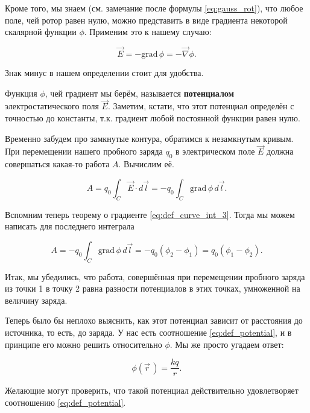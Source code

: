 \documentclass[11pt,a4paper]{article}
\numberwithin{equation}{section}
\newcommand{\grad}{\mathrm{grad}\,}
\newcommand{\vn}{\vec{\nabla}}
\begin{document}
Кроме того, мы знаем (см. замечание после формулы
\eqref{eq:gauss_rot}), что любое поле, чей ротор равен нулю, можно
представить в виде градиента некоторой скалярной функции
$\phi$. Применим это к нашему случаю:

\begin{equation}
  \label{eq:def_potential}
  \vec{E}  = -\grad \phi = -\vn \phi.
\end{equation}

Знак минус в нашем определении стоит для удобства.

Функция $\phi$, чей градиент мы берём, называется \textbf{потенциалом}
электростатического поля $\vec{E}$. Заметим, кстати, что этот
потенциал определён с точностью до константы, т.к. градиент любой
постоянной функции равен нулю. 

Временно забудем про замкнутые контура, обратимся к незамкнутым
кривым. При перемещении нашего пробного заряда $q_0$ в электрическом поле
$\vec{E}$ должна совершаться какая-то работа $A$. Вычислим её. 

\begin{equation}
  \label{eq:work_statics_1}
  A = q_0 \int_C \vec{E} \cdot d\vec{l} = -q_0 \int_C \grad \phi\, d\vec{l}.
\end{equation}

Вспомним теперь теорему о градиенте \eqref{eq:def_curve_int_3}. Тогда
мы можем написать для последнего интеграла

\begin{equation}
  \label{eq:work_statics_2}
  A = -q_0 \int_C \grad \phi\, d\vec{l} = -q_0 (\phi_2 - \phi_1) = q_0
  (\phi_1 - \phi_2). 
\end{equation}

Итак, мы убедились, что работа, совершённая при перемещении пробного
заряда из точки 1 в точку 2 равна разности потенциалов в этих точках,
умноженной на величину заряда. 

Теперь было бы неплохо выяснить, как этот потенциал зависит от
расстояния до источника, то есть, до заряда. У нас есть соотношение
\eqref{eq:def_potential}, и в принципе его можно решить относительно
$\phi$. Мы же просто угадаем ответ:

\begin{equation}
  \label{eq:potential_r}
  \phi(\vec{r}\,) = \frac{kq}{r}. 
\end{equation}

Желающие могут проверить, что такой потенциал действительно
удовлетворяет соотношению \eqref{eq:def_potential}. 
\end{document}
